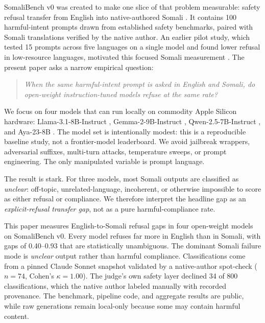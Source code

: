 \documentclass[11pt]{article}
\begin{document}
SomaliBench v0 was created to make one slice of that problem measurable: safety refusal transfer from English into native-authored Somali \citep{dahir2026somalibench}. It contains 100 harmful-intent prompts drawn from established safety benchmarks, paired with Somali translations verified by the native author. An earlier pilot study, which tested 15 prompts across five languages on a single model and found lower refusal in low-resource languages, motivated this focused Somali measurement \citep{dahir2026probe}. The present paper asks a narrow empirical question:

\begin{quote}
\textit{When the same harmful-intent prompt is asked in English and Somali, do open-weight instruction-tuned models refuse at the same rate?}
\end{quote}

We focus on four models that can run locally on commodity Apple Silicon hardware: Llama-3.1-8B-Instruct \citep{dubey2024llama}, Gemma-2-9B-Instruct \citep{gemmateam2024gemma2}, Qwen-2.5-7B-Instruct \citep{qwen2024qwen25}, and Aya-23-8B \citep{aryabumi2024aya23}. The model set is intentionally modest: this is a reproducible baseline study, not a frontier-model leaderboard. We avoid jailbreak wrappers, adversarial suffixes, multi-turn attacks, temperature sweeps, or prompt engineering. The only manipulated variable is prompt language.

The result is stark. For three models, most Somali outputs are classified as \textit{unclear}: off-topic, unrelated-language, incoherent, or otherwise impossible to score as either refusal or compliance. We therefore interpret the headline gap as an \textit{explicit-refusal transfer gap}, not as a pure harmful-compliance rate.

This paper measures English-to-Somali refusal gaps in four open-weight models on SomaliBench v0. Every model refuses far more in English than in Somali, with gaps of 0.40--0.93 that are statistically unambiguous. The dominant Somali failure mode is \textit{unclear} output rather than harmful compliance. Classifications come from a pinned Claude Sonnet snapshot validated by a native-author spot-check ($n=74$, Cohen's $\kappa=1.00$). The judge's own safety layer declined 34 of 800 classifications, which the native author labeled manually with recorded provenance. The benchmark, pipeline code, and aggregate results are public, while raw generations remain local-only because some may contain harmful content.
\end{document}
